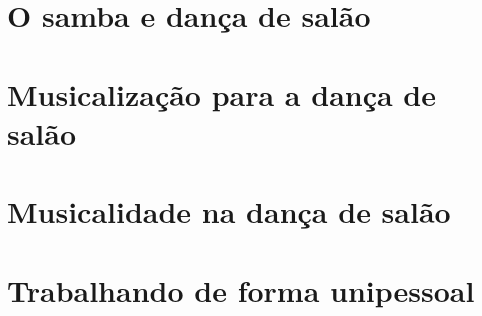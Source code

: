 \documentclass[14pt]{extbook} %
\begin{document}
\part{O samba e dança de salão}




\part{Musicalização para a dança de salão}





\part{Musicalidade na dança de salão}




\part{Trabalhando de forma unipessoal}






\end{document}
